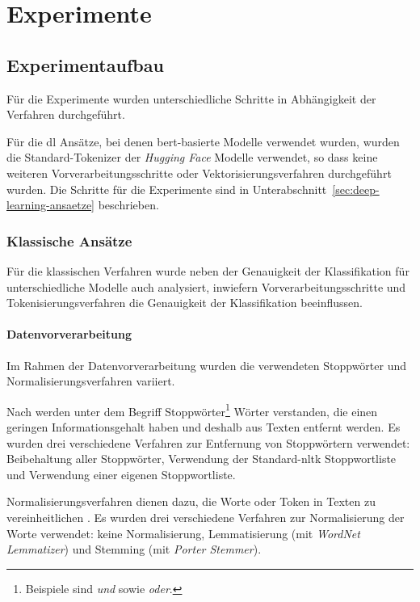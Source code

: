 \section{Experimente}

\subsection{Experimentaufbau}

Für die Experimente wurden unterschiedliche Schritte in Abhängigkeit der Verfahren durchgeführt.

Für die \gls{dl} Ansätze, bei denen \gls{bert}-basierte Modelle verwendet wurden, wurden die Standard-Tokenizer der \textit{Hugging Face} Modelle verwendet, so dass keine weiteren Vorverarbeitungsschritte oder Vektorisierungsverfahren durchgeführt wurden.
Die Schritte für die Experimente sind in Unterabschnitt~\ref{sec:deep-learning-ansaetze} beschrieben.

\subsubsection{Klassische Ansätze}\label{sec:klassische-ansaetze}

Für die klassischen Verfahren wurde neben der Genauigkeit der Klassifikation für unterschiedliche Modelle auch analysiert, inwiefern Vorverarbeitungsschritte und Tokeni\-sie\-rungs\-verfahren die Genauigkeit der Klassifikation beeinflussen.

\paragraph{Datenvorverarbeitung}
Im Rahmen der Datenvorverarbeitung wurden die verwendeten Stoppwörter und Normalisierungsverfahren variiert.

Nach \cite[S.27]{manning2009introduction} werden unter dem Begriff Stoppwörter\footnote{Beispiele sind \textit{und} sowie \textit{oder}.} Wörter verstanden, die einen geringen Informationsgehalt haben und deshalb aus Texten entfernt werden.
Es wurden drei verschiedene Verfahren zur Entfernung von Stoppwörtern verwendet: Beibehaltung aller Stoppwörter, Verwendung der Standard-\gls{nltk} Stoppwortliste und Verwendung einer eigenen Stoppwortliste.

Normalisierungsverfahren dienen dazu, die Worte oder Token in Texten zu vereinheitlichen \cite[S.28]{manning2009introduction}.
Es wurden drei verschiedene Verfahren zur Normalisierung der Worte verwendet: keine Normalisierung, Lemmatisierung (mit \textit{WordNet Lemmatizer}) und Stemming (mit \textit{Porter Stemmer}).

